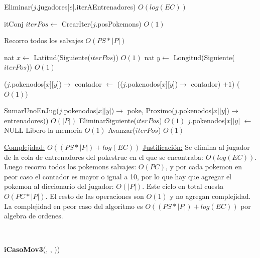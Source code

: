 \begin{Algoritmos}
\begin{algorithmic}[1]
\State Eliminar($j$.jugadores[$e$].iterAEntrenadores) \Comment $O(log(EC))$

\State itConj $iterPos \gets$ CrearIter($j$.posPokemons) \Comment $O(1)$ 

 Recorro todos los salvajes \Comment $O(PS * |P|)$

  \State nat $x \gets$ Latitud(Siguiente($iterPos$)) \Comment $O(1)$
  \State nat $y \gets$ Longitud(Siguiente($iterPos$)) \Comment $O(1)$   
  
  \State ($j$.pokenodos[$x$][$y$])$\rightarrow$ contador $\gets$ (($j$.pokenodos[$x$][$y$])$\rightarrow$ contador) $+ 1$) \Comment($O(1)$)
  
    \State SumarUnoEnJug($j$.pokenodos[$x$][$y$])$\rightarrow$ poke, Proximo($j$.pokenodos[$x$][$y$])$\rightarrow$ entrenadores)) \Comment $O(|P|)$
    \State EliminarSiguiente($iterPos$) \Comment $O(1)$
    \State $j$.pokenodos[$x$][$y$] $\gets$ NULL \Comment Libero la memoria $O(1)$
  \Else 
    \State Avanzar($iterPos$) \Comment $O(1)$ 
  \EndIf

\EndWhile 



\medskip
\Statex \underline{Complejidad:} $O((PS *|P|) + log(EC))$ 
\Statex \underline{Justificaci\'on:} Se elimina al jugador de la cola de entrenadores del pokestruc en el que se encontraba: $O(log(EC))$. Luego recorro todos los pokemons salvajes: $O(PC)$, y por cada pokemon en peor caso el contador es mayor o igual a 10, por lo que hay que agregar el pokemon al diccionario del jugador: $O(|P|)$. Este ciclo en total cuesta $O(PC*|P|)$. El resto de las operaciones son $O(1)$ y no agregan complejidad. La complejidad en peor caso del algoritmo es $O((PS *|P|) + log(EC))$ por algebra de ordenes.
\end{algorithmic}

$ $\newline
$ $\newline



{\textbf{iCasoMov3}(,  , ))}
\begin{algorithmic}[1]


\end{algorithmic}
\end{Algoritmos}
